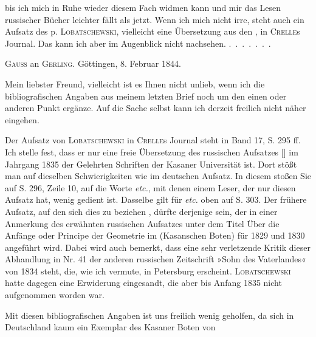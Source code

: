 %
bis ich mich in Ruhe wieder diesem Fach widmen kann und mir das Lesen russischer Bücher leichter fällt als jetzt. Wenn ich mich nicht irre, steht auch ein Aufsatz des p. \textsc{Lobatschewski}, vielleicht eine Übersetzung aus den , in \textsc{Crelle}s Journal. Das kann ich aber im Augenblick nicht nachsehen. \mbox{.\ .\ .\ .\ .\ .\ .}

\par\bigskip{}

\begin{center}\textsc{Gauss} an \textsc{Gerling}. Göttingen, 8. Februar 1844.\end{center}

Mein liebster Freund, vielleicht ist es Ihnen nicht unlieb, wenn ich die bibliografischen Angaben aus meinem letzten Brief noch um den einen oder anderen Punkt ergänze. Auf die Sache selbst kann ich derzeit freilich nicht näher eingehen.

Der Aufsatz von \textsc{Lobatschewski} in \textsc{Crelle}s Journal steht in Band 17, S. 295 ff. Ich stelle fest, dass er nur eine freie Übersetzung des russischen Aufsatzes [] im Jahrgang 1835 der Gelehrten Schriften der Kasaner Universität ist. Dort stößt man auf dieselben Schwierigkeiten wie im deutschen Aufsatz. In diesem stoßen Sie auf S. 296, Zeile 10, auf die Worte  \emph{etc.}, mit denen einem Leser, der nur diesen Aufsatz hat, wenig gedient ist. Dasselbe gilt für  \emph{etc.} oben auf S. 303. Der frühere Aufsatz, auf den sich dies zu beziehen , dürfte derjenige sein, der in einer Anmerkung des erwähnten russischen Aufsatzes unter dem Titel Über die Anfänge oder Principe der Geometrie im  (Kasanschen Boten) für 1829 und 1830 angeführt wird. Dabei wird auch bemerkt, dass eine sehr verletzende Kritik dieser Abhandlung in Nr. 41 der anderen russischen Zeitschrift »Sohn des Vaterlandes«  von 1834 steht, die, wie ich vermute, in Petersburg erscheint. \textsc{Lobatschewski} hatte dagegen eine Erwiderung eingesandt, die aber bis Anfang 1835 nicht aufgenommen worden war.

Mit diesen bibliografischen Angaben ist uns freilich wenig geholfen, da sich in Deutschland kaum ein Exemplar des Kasaner Boten von\space%

